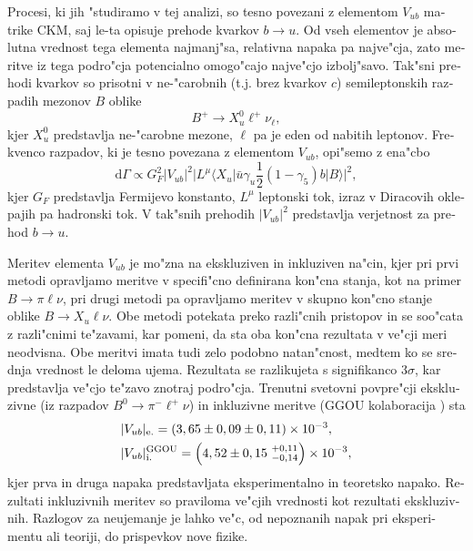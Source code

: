 \begin{otherlanguage}{slovene}
Procesi, ki jih "studiramo v tej analizi, so tesno povezani z elementom $V_{ub}$ matrike CKM, saj le-ta opisuje prehode kvarkov $b \to u$. Od vseh elementov je absolutna vrednost tega elementa najmanj"sa, relativna napaka pa najve"cja, zato meritve iz tega podro"cja potencialno omogo"cajo najve"cjo izbolj"savo. Tak"sni prehodi kvarkov so prisotni v ne-"carobnih (t.j. brez kvarkov $c$) semileptonskih razpadih mezonov $B$ oblike 
\begin{equation}
B^+ \to X_u^0 \ell^+ \nu_\ell,
\end{equation}
kjer $X_u^0$ predstavlja ne-"carobne mezone, $\ell$ pa je eden od nabitih leptonov. Frekvenco razpadov, ki je tesno povezana z elementom $V_{ub}$, opi"semo z ena"cbo
\begin{equation}
\mathrm{d} \Gamma \propto G_F^2 \vert V_{ub} \vert ^2 \vert L^\mu \langle X_u \vert \bar u \gamma_u \frac{1}{2} (1-\gamma_5) b \vert B \rangle \vert ^2,
\end{equation}
kjer $G_F$ predstavlja Fermijevo konstanto, $L^\mu$ leptonski tok, izraz v Diracovih oklepajih pa hadronski tok. V tak"snih prehodih $\vert V_{ub} \vert ^2$ predstavlja verjetnost za prehod $b \to u$.

Meritev elementa $V_{ub}$ je mo"zna na ekskluziven in inkluziven na"cin, kjer pri prvi metodi opravljamo meritve v specifi"cno definirana kon"cna stanja, kot na primer $B \to \pi \ell \nu$, pri drugi metodi pa opravljamo meritev v skupno kon"cno stanje oblike $B \to X_u \ell \nu$. Obe metodi potekata preko razli"cnih pristopov in se soo"cata z razli"cnimi te"zavami, kar pomeni, da sta oba kon"cna rezultata v ve"cji meri neodvisna. Obe meritvi imata tudi zelo podobno natan"cnost, medtem ko se srednja vrednost le deloma ujema. Rezultata se razlikujeta s signifikanco $3\sigma$, kar predstavlja ve"cjo te"zavo znotraj podro"cja. Trenutni svetovni povpre"cji \cite{Amhis:2016xyh} ekskluzivne (iz razpadov $B^0 \to \pi^- \ell^+ \nu$) in inkluzivne meritve (GGOU kolaboracija \cite{Gambino:2007rp}) sta
\begin{align}
&\vert V_{ub} \vert_{\mathrm{e.}} = \left(3,65 \pm 0,09 \pm 0,11\right)\times 10^{-3},\\
&\vert V_{ub} \vert_{\mathrm{i.}}^{\mathrm{GGOU}} = \left(4,52 \pm 0,15~{}^{+0,11}_{-0,14}\right)\times 10^{-3},
\end{align}
kjer prva in druga napaka predstavljata eksperimentalno in teoretsko napako. Rezultati inkluzivnih meritev so praviloma ve"cjih vrednosti kot rezultati ekskluzivnih. Razlogov za neujemanje je lahko ve"c, od nepoznanih napak pri eksperimentu ali teoriji, do prispevkov nove fizike.


\end{otherlanguage}
